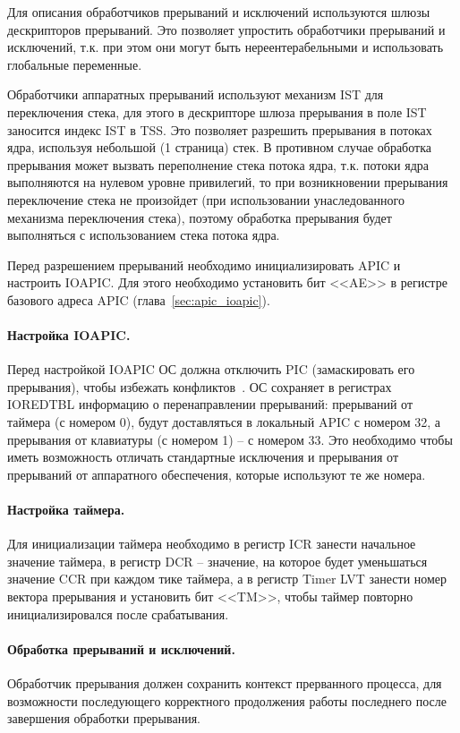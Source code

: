 Для описания обработчиков прерываний и исключений используются шлюзы дескрипторов прерываний.
Это позволяет упростить обработчики прерываний и исключений, т.к. при этом они могут быть
нереентерабельными и использовать глобальные переменные.

Обработчики аппаратных прерываний используют механизм IST для переключения стека, для этого
в дескрипторе шлюза прерывания в поле IST заносится индекс IST в TSS. Это позволяет
разрешить прерывания в потоках ядра, используя небольшой (1 страница) стек. В противном случае
обработка прерывания может вызвать переполнение стека потока ядра, т.к. потоки ядра выполняются
на нулевом уровне привилегий, то при возникновении прерывания переключение стека не произойдет
(при использовании унаследованного механизма переключения стека), поэтому обработка прерывания
будет выполняться с использованием стека потока ядра.

Перед разрешением прерываний необходимо инициализировать APIC и настроить IOAPIC. Для этого
необходимо установить бит <<AE>> в регистре базового адреса APIC (глава~\ref{sec:apic_ioapic}).

\paragraph{Настройка IOAPIC.} Перед настройкой IOAPIC ОС должна отключить PIC (замаскировать его прерывания),
чтобы избежать конфликтов~\cite{os_dev}. ОС сохраняет в регистрах IOREDTBL информацию о перенаправлении
прерываний: прерываний от таймера (с номером 0), будут доставляться в локальный APIC с номером 32, а прерывания от
клавиатуры (с номером 1) -- с номером 33. Это необходимо чтобы иметь возможность отличать стандартные исключения и
прерывания от прерываний от аппаратного обеспечения, которые используют те же номера.

\paragraph{Настройка таймера.} Для инициализации таймера необходимо в регистр ICR занести начальное значение
таймера, в регистр DCR -- значение, на которое будет уменьшаться значение CCR при каждом тике таймера,
а в регистр Timer LVT занести номер вектора прерывания и установить бит <<TM>>, чтобы таймер повторно
инициализировался после срабатывания.

\paragraph{Обработка прерываний и исключений.} Обработчик прерывания должен сохранить контекст прерванного
процесса, для возможности последующего корректного продолжения работы последнего после завершения обработки
прерывания.

